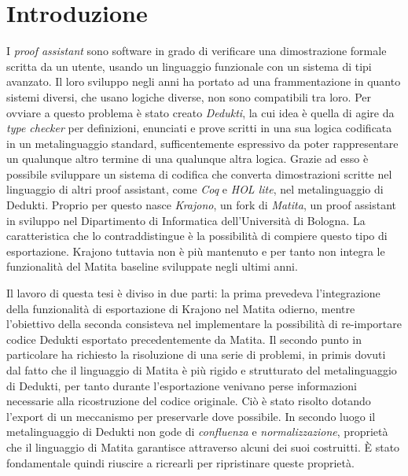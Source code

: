 \documentclass[12pt,a4paper]{report}
\begin{document}
\chapter*{Introduzione}
I \textit{proof assistant} sono software in grado di verificare una dimostrazione
formale scritta da un utente, usando un linguaggio funzionale con un sistema di
tipi avanzato. Il loro sviluppo negli anni ha portato ad una frammentazione
in quanto sistemi diversi, che usano logiche diverse, non sono compatibili tra 
loro. Per ovviare a questo problema è stato creato \textit{Dedukti}, la cui idea è quella
di agire da \textit{type checker} per definizioni, enunciati e prove scritti in
una sua logica codificata in un metalinguaggio standard, sufficentemente espressivo 
da poter rappresentare un qualunque altro termine di una qualunque altra logica.
Grazie ad esso è possibile sviluppare un sistema di codifica che converta dimostrazioni
scritte nel linguaggio di altri proof assistant, come \textit{Coq} e \textit{HOL lite},
nel metalinguaggio di Dedukti. Proprio per questo nasce \textit{Krajono}, un
fork di \textit{Matita}, un proof assistant in sviluppo nel Dipartimento 
di Informatica dell'Università di Bologna. La caratteristica che lo contraddistingue
è la possibilità di compiere questo tipo di esportazione. Krajono tuttavia non
è più mantenuto e per tanto non integra le funzionalità del Matita baseline
sviluppate negli ultimi anni. 

Il lavoro di questa tesi è diviso in due parti: la prima prevedeva l'integrazione della 
funzionalità di esportazione di Krajono nel Matita odierno, mentre l'obiettivo della seconda
consisteva nel implementare la possibilità di re-importare
codice Dedukti esportato precedentemente da Matita. Il secondo punto in particolare 
ha richiesto la risoluzione di una serie di problemi, in primis dovuti dal fatto che
il linguaggio di Matita è più rigido e strutturato del metalinguaggio di Dedukti,
per tanto durante l'esportazione venivano perse informazioni necessarie alla
ricostruzione del codice originale. Ciò è stato risolto dotando l'export di
un meccanismo per preservarle dove possibile. In secondo luogo il metalinguaggio 
di Dedukti non gode di \textit{confluenza} e \textit{normalizzazione}, proprietà 
che il linguaggio di Matita garantisce attraverso alcuni dei suoi costruitti.
È stato fondamentale quindi riuscire a ricrearli per ripristinare queste proprietà.
\end{document}
